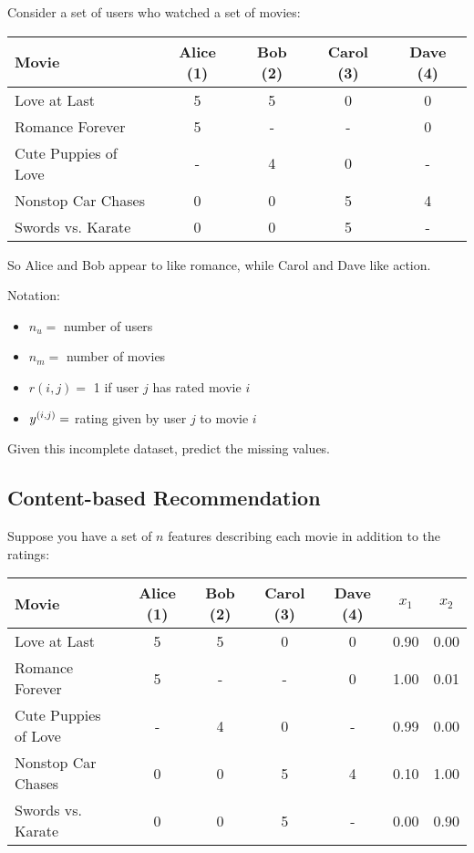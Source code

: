 Consider a set of users who watched a set of movies:

\begin{center}
\begin{tabular}{l|cccc}
    Movie                & Alice (1) & Bob (2) & Carol (3) & Dave (4) \\ \hline
    Love at Last         & 5 & 5 & 0 & 0 \\
    Romance Forever      & 5 & - & - & 0 \\
    Cute Puppies of Love & - & 4 & 0 & - \\
    Nonstop Car Chases   & 0 & 0 & 5 & 4 \\
    Swords vs. Karate    & 0 & 0 & 5 & -
\end{tabular}
\end{center}

So Alice and Bob appear to like romance, while Carol and Dave like action.

Notation:
\begin{itemize}
    \item $n_u=$ number of users
    \item $n_m=$ number of movies
    \item $r(i,j)=$ 1 if user $j$ has rated movie $i$
    \item $y_{}^{(i,j)}=$ rating given by user $j$ to movie $i$
\end{itemize}

Given this incomplete dataset, predict the missing values.

\subsection{Content-based Recommendation}

Suppose you have a set of $n$ features describing each movie in addition to the ratings:

\begin{center}
\begin{tabular}{l|cccc|cc}
    Movie                & Alice (1) & Bob (2) & Carol (3) & Dave (4) & $x_1$ & $x_2$ \\ \hline
    Love at Last         & 5 & 5 & 0 & 0 & 0.90 & 0.00 \\
    Romance Forever      & 5 & - & - & 0 & 1.00 & 0.01 \\
    Cute Puppies of Love & - & 4 & 0 & - & 0.99 & 0.00 \\
    Nonstop Car Chases   & 0 & 0 & 5 & 4 & 0.10 & 1.00 \\
    Swords vs. Karate    & 0 & 0 & 5 & - & 0.00 & 0.90
\end{tabular}
\end{center}

